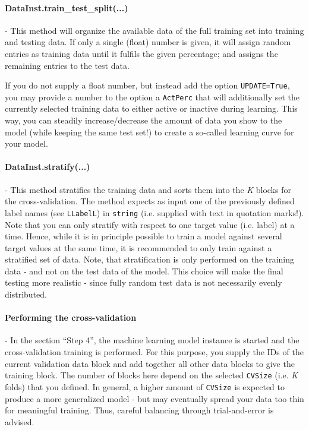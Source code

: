 \documentclass[12pt]{achemso}
\begin{document}
\paragraph{DataInst.train\_test\_split(...)} - This method will organize the available data of the full training set into training and testing data. If only a single (float) number is given, it will assign random entries as training data until it fulfils the given percentage; and assigns the remaining entries to the test data.

\noindent If you do not supply a float number, but instead add the option \texttt{UPDATE=True}, you may provide a number to the option a \texttt{ActPerc} that will additionally set the currently selected training data to either active or inactive during learning. This way, you can steadily increase/decrease the amount of data you show to the model (while keeping the same test set!) to create a so-called learning curve for your model.

\paragraph{DataInst.stratify(...)} - This method stratifies the training data and sorts them into the \textit{K} blocks for the cross-validation. The method expects as input one of the previously defined label names (see \texttt{LLabelL}) in \texttt{string} (i.e. supplied with text in quotation marks!). Note that you can only stratify with respect to one target value  (i.e. label) at a time. Hence, while it is in principle possible to train a model against several target values at the same time, it is recommended to only train against a stratified set of data. Note, that stratification is only performed on the training data - and not on the test data of the model. This choice will make the final testing more realistic - since fully random test data is not necessarily evenly distributed.

\paragraph{Performing the cross-validation} - In the section ``Step 4'', the machine learning model instance is started and the cross-validation training is performed. For this purpose, you supply the IDs of the current validation data block and add together all other data blocks to give the training block. The number of blocks here depend on the selected \texttt{CVSize} (i.e. \textit{K} folds) that you defined. In general, a higher amount of \texttt{CVSize} is expected to produce a more generalized model - but may eventually spread your data too thin for meaningful training. Thus, careful balancing through trial-and-error is advised.
\end{document}

